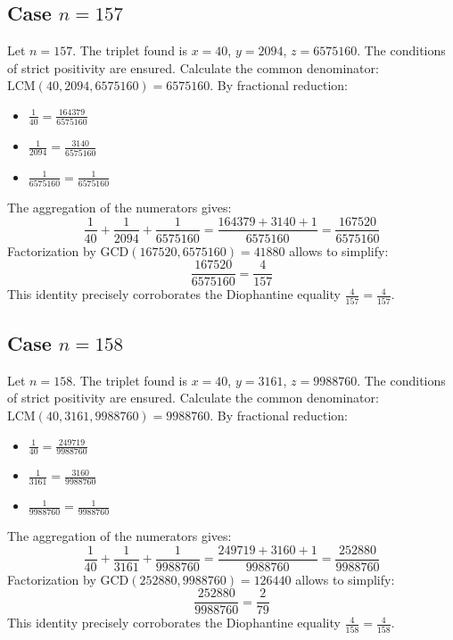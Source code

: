 \documentclass[11pt,a4paper]{article}
\begin{document}
\subsection{Case $n = 157$}
Let $n = 157$. The triplet found is $x = 40$, $y = 2094$, $z = 6575160$.
The conditions of strict positivity are ensured.
Calculate the common denominator: $\text{LCM}(40, 2094, 6575160) = 6575160$.
By fractional reduction:
\begin{itemize}
    \item $\frac{1}{40} = \frac{164379}{6575160}$
    \item $\frac{1}{2094} = \frac{3140}{6575160}$
    \item $\frac{1}{6575160} = \frac{1}{6575160}$
\end{itemize}
The aggregation of the numerators gives:
$$ \frac{1}{40} + \frac{1}{2094} + \frac{1}{6575160} = \frac{164379 + 3140 + 1}{6575160} = \frac{167520}{6575160} $$
Factorization by $\text{GCD}(167520, 6575160) = 41880$ allows to simplify:
$$ \frac{167520}{6575160} = \frac{4}{157} $$
This identity precisely corroborates the Diophantine equality $\frac{4}{157} = \frac{4}{157}$.

\subsection{Case $n = 158$}
Let $n = 158$. The triplet found is $x = 40$, $y = 3161$, $z = 9988760$.
The conditions of strict positivity are ensured.
Calculate the common denominator: $\text{LCM}(40, 3161, 9988760) = 9988760$.
By fractional reduction:
\begin{itemize}
    \item $\frac{1}{40} = \frac{249719}{9988760}$
    \item $\frac{1}{3161} = \frac{3160}{9988760}$
    \item $\frac{1}{9988760} = \frac{1}{9988760}$
\end{itemize}
The aggregation of the numerators gives:
$$ \frac{1}{40} + \frac{1}{3161} + \frac{1}{9988760} = \frac{249719 + 3160 + 1}{9988760} = \frac{252880}{9988760} $$
Factorization by $\text{GCD}(252880, 9988760) = 126440$ allows to simplify:
$$ \frac{252880}{9988760} = \frac{2}{79} $$
This identity precisely corroborates the Diophantine equality $\frac{4}{158} = \frac{4}{158}$.
\end{document}
